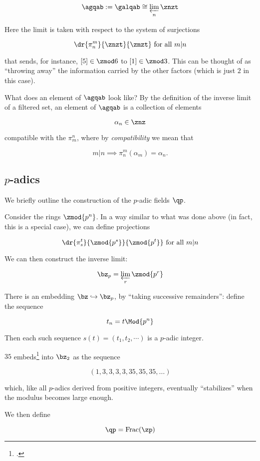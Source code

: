 \[ \agqab := \galqab \cong \varprojlim_n \znzt \]

Here the limit is taken with respect to the system of surjections

\[ \dr {\pi_ n^m} {\znzt} {\zmzt} \text{ for all } m|n \]

that sends, for instance, $[5]\in{\zmod 6}$ to $[1]\in\zmod 3$. This can be
thought of as ``throwing away'' the information carried by the other factors
(which is just $2$ in this case).

What does an element of $\agqab$ look like? By the definition of the inverse
limit of a filtered set, an element of $\agqab$ is a collection of
elements

\[ \alpha_n \in \znz \]

compatible with the $\pi_m^n$, where by
\textit{compatibility} we mean that

\[ m|n \implies \pi_n^m(\alpha_m) = \alpha_n. \]

\subsection{$p$-adics}
We briefly outline the construction of the $p$-adic fields $\qp$.

Consider the rings $\zmod {p^n}$. In a way similar to what was done above (in
fact, this is a special case), we can define projections

\[ \dr {\pi_ s^t} {\zmod {p^s}} {\zmod {p^t}} \text{ for all } m|n \]

We can then construct the inverse limit:

\[ \bz_p = \varprojlim_r \zmod {p^r} \]

There is an embedding $\bz\hookrightarrow\bz_p$, by ``taking successive
remainders'': define the sequence

\[ t_n = t \Mod{p^n} \]

Then each such sequence $s(t) = (t_1, t_2, \cdots)$ is a $p$-adic integer.

\begin{example}
  $35$ embeds\footcite{Wikipedia} into $\bz_2$ as the sequence

  \[  (1, 3, 3, 3, 3, 35, 35, 35, \ldots)\]

  which, like all $p$-adics derived from positive integers, eventually ``stabilizes'' when
  the modulus becomes large enough.
\end{example}

We then define

\[ \qp = \rm{Frac}(\zp) \]


